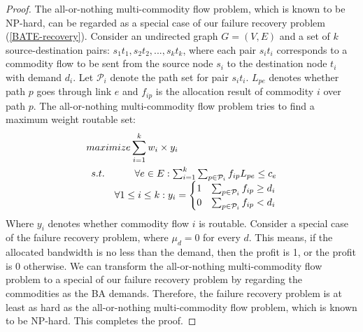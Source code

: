 \documentclass[sigconf]{acmart}
\begin{document}
\begin{appendices}
 
\begin{proof}
The all-or-nothing multi-commodity flow problem, which is known to be NP-hard\cite{inproceedings2}, 
can be regarded as a special case of our failure recovery problem (\ref{BATE-recovery}).
Consider an undirected graph $G = (V,E)$ and a set of $k$ source-destination pairs: $s_1t_1, s_2t_2,..., s_kt_k$,
where each pair $s_it_i$ corresponds to a commodity flow to be sent from the source node $s_i$ to the destination node $t_i$ with demand $d_i$.
Let $\mathcal{P}_i$ denote the path set for pair $s_it_i$.
$L_{pe}$ denotes whether path $p$ goes through link $e$ and $f_{ip}$ is the allocation result of commodity $i$ over path $p$.
The  all-or-nothing multi-commodity flow problem tries to find a maximum weight routable set:
\begin{equation}
\begin{aligned} \label{P}
&maximize  \sum_{i=1}^k w_i \times y_i\\
&\begin{array}{r@{\quad}r@{}l@{\quad}l}
s.t. &\forall e \in E: \sum_{i=1}^k\sum_{p\in \mathcal{P}_i}f_{ip}L_{pe} \le c_e \\
     &\forall  1\le i \le k  : y_i=
\begin{cases}
1 &\text{$\sum_{p \in \mathcal{P}_i}f_{ip} \ge d_i$}\\
0 &\text{$\sum_{p\in \mathcal{P}_i}f_{ip} < d_i$}
\end{cases}\\
\end{array}
\end{aligned}
\end{equation}
Where $y_i$ denotes whether commodity flow $i$ is routable.
Consider a special case of the failure recovery problem, where $\mu_d=0$ for every $d$.
This means, if the allocated bandwidth is no less than the demand, 
then the profit is 1, or the profit is 0 otherwise.
We can transform the all-or-nothing multi-commodity flow problem to a special of our failure recovery problem by 
regarding the commodities as the BA demands.
Therefore, the failure recovery problem is at least as hard as the all-or-nothing multi-commodity flow
problem, which is known to be NP-hard. This completes the proof.
\end{proof}

\end{appendices}
\end{document}

